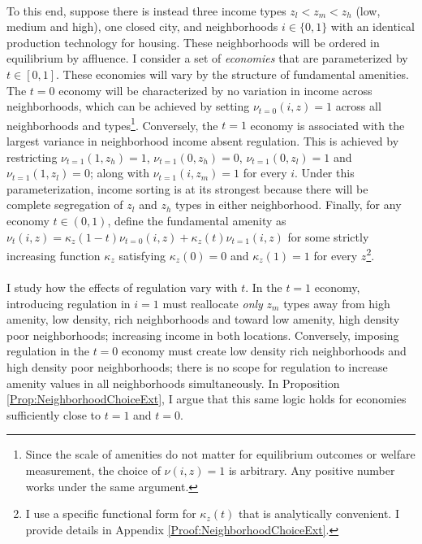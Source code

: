 \documentclass[12pt]{article}
\begin{document}
\paragraph*{}
To this end, suppose there is instead three income types $z_{l} < z_{m} < z_{h}$ (low, medium and high), one closed city, and neighborhoods $i \in \{0, 1\}$ with an identical production technology for housing. These neighborhoods will be ordered in equilibrium by affluence. I consider a set of \textit{economies} that are parameterized by $t \in [0, 1]$. These economies will vary by the structure of fundamental amenities. The $t = 0$ economy will be characterized by no variation in income across neighborhoods, which can be achieved by setting $\nu_{t = 0}(i, z) = 1$ across all neighborhoods and types\footnote{Since the scale of amenities do not matter for equilibrium outcomes or welfare measurement, the choice of $\nu(i, z) = 1$ is arbitrary. Any positive number works under the same argument.}. Conversely, the $t = 1$ economy is associated with the largest variance in neighborhood income absent regulation. This is achieved by restricting $\nu_{t = 1}(1, z_{h}) = 1$, $\nu_{t = 1}(0, z_{h}) = 0$, $\nu_{t = 1}(0, z_{l}) = 1$ and $\nu_{t = 1}(1, z_{l}) = 0$; along with $\nu_{t = 1}(i, z_{m}) = 1$ for every $i$. Under this parameterization, income sorting is at its strongest because there will be complete segregation of $z_{l}$ and $z_{h}$ types in either neighborhood. Finally, for any economy $t \in (0, 1)$, define the fundamental amenity as $\nu_{t}(i, z) = \kappa_{z}(1-t)\nu_{t = 0}(i, z) + \kappa_{z}(t)\nu_{t = 1}(i, z)$ for some strictly increasing function $\kappa_{z}$ satisfying $\kappa_{z}(0) = 0$ and $\kappa_{z}(1) = 1$ for every $z$\footnote{I use a specific functional form for $\kappa_{z}(t)$ that is analytically convenient. I provide details in Appendix \ref{Proof:NeighborhoodChoiceExt}.}.  

\paragraph*{} 
I study how the effects of regulation vary with $t$. In the $t = 1$ economy, introducing regulation in $i = 1$ must reallocate \textit{only} $z_{m}$ types away from high amenity, low density, rich neighborhoods and toward low amenity, high density poor neighborhoods; increasing income in both locations. Conversely, imposing regulation in the $t = 0$ economy must create low density rich neighborhoods and high density poor neighborhoods; there is no scope for regulation to increase amenity values in all neighborhoods simultaneously. In Proposition \ref{Prop:NeighborhoodChoiceExt}, I argue that this same logic holds for economies sufficiently close to $t = 1$ and $t = 0$.
\end{document}
